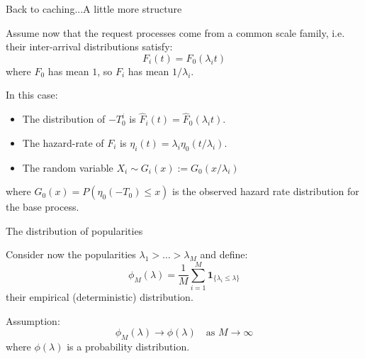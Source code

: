 \documentclass[aspectratio=169]{beamer}
\newcommand{\ind}[1]{\mathbf{1}_{#1}}
\newenvironment*{myitem}[1][1.5em]{\begin{itemize}\setlength{\itemsep}{#1}}{\end{itemize}}
\begin{document}
\begin{frame}{Back to caching...}{A little more structure}
	
	Assume now that the request processes come from a common scale family, i.e. their inter-arrival distributions satisfy:
	\begin{equation*}
		F_i(t) = F_0(\lambda_i t)
	\end{equation*}
	where $F_0$ has mean $1$, so $F_i$ has mean $1/\lambda_i$.

	\pause \vfill

	In this case:
	\begin{myitem}[1em]
		\item The distribution of $-T_0^i$ is $\hat{F}_i(t) = \hat{F}_0(\lambda_i t)$.
		\item The hazard-rate of $F_i$ is $\eta_i(t) = \lambda_i \eta_0(t/\lambda_i)$.
		\item The random variable $X_i\sim G_i(x):=G_0(x/\lambda_i)$
	\end{myitem}
	\vfill
	where $G_0(x) = P(\eta_0(-T_0)\leqslant x)$ is the observed hazard rate distribution for the base process.

\end{frame}

\begin{frame}{The distribution of popularities}
	
	Consider now the popularities $\lambda_1> \ldots > \lambda_M$ and define:
	\begin{equation*}
		\phi_M(\lambda) = \frac{1}{M}\sum_{i=1}^M \ind{\{\lambda_i\leqslant \lambda\}}
	\end{equation*}
	their empirical (deterministic) distribution.

	\pause \vfill
	\alert{Assumption:}
	\begin{equation*}
		\phi_M(\lambda) \to \phi(\lambda) \quad \text{as } M\to\infty
	\end{equation*}
	where $\phi(\lambda)$ is a probability distribution.
\end{frame}
\end{document}
